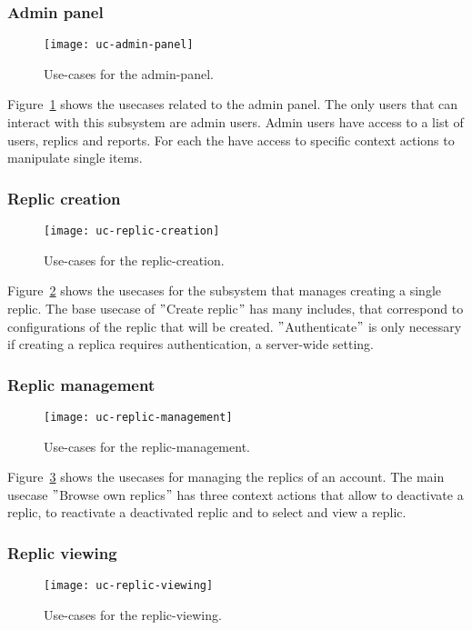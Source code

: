 \subsubsection{Admin panel}
\begin{figure}
    \centering
    \texttt{[image: uc-admin-panel]}
    \caption{Use-cases for the admin-panel.}
    \label{fig:admin-panel}
\end{figure}

Figure~\ref{fig:admin-panel} shows the usecases related to the admin panel.
The only users that can interact with this subsystem are admin users.
Admin users have access to a list of users, replics and reports.
For each the have access to specific context actions to manipulate single items.

\subsubsection{Replic creation}
\begin{figure}
    \centering
    \texttt{[image: uc-replic-creation]}
    \caption{Use-cases for the replic-creation.}
    \label{fig:replic-creation}
\end{figure}

Figure~\ref{fig:replic-creation} shows the usecases for the subsystem that manages creating a single replic.
The base usecase of \("\)Create replic\("\) has many includes, that correspond to configurations of the replic that will be created.
\("\)Authenticate\("\) is only necessary if creating a replica requires authentication, a server-wide setting.

\subsubsection{Replic management}
\begin{figure}
    \centering
    \texttt{[image: uc-replic-management]}
    \caption{Use-cases for the replic-management.}
    \label{fig:replic-management}
\end{figure}

Figure~\ref{fig:replic-management} shows the usecases for managing the replics of an account.
The main usecase \("\)Browse own replics\("\) has three context actions that allow to deactivate a replic, to reactivate a deactivated replic and to select and view a replic.

\subsubsection{Replic viewing}
\begin{figure}
    \centering
    \texttt{[image: uc-replic-viewing]}
    \caption{Use-cases for the replic-viewing.}
    \label{fig:replic-viewing}
\end{figure}

